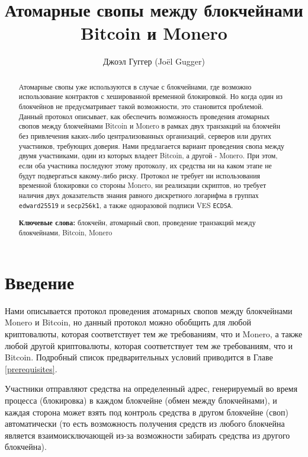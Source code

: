 \documentclass{llncs}
\begin{document}
\title{Атомарные свопы между блокчейнами Bitcoin и Monero}
\author{Джоэл Гуггер (Jo\"el Gugger)}


\maketitle

\begin{abstract}
    Атомарные свопы уже используются в случае с блокчейнами, где возможно использование контрактов с хешированной временной блокировкой. Но когда один из блокчейнов не предусматривает такой возможности, это становится проблемой. Данный протокол описывает, как обеспечить возможность проведения атомарных свопов между блокчейнами Bitcoin и Monero в рамках двух транзакций на блокчейн без привлечения каких-либо централизованных организаций, серверов или других участников, требующих доверия.
    Нами предлагается вариант проведения свопа между двумя участниками, один из которых владеет Bitcoin, а другой - Monero. При этом, если оба участника последуют этому протоколу, их средства ни на каком этапе не будут подвергаться какому-либо риску. Протокол не требует ни использования временной блокировки со стороны Monero, ни реализации скриптов, но требует наличия двух доказательств знания равного дискретного логарифма в группах \texttt{edward25519} и \texttt{secp256k1}, а также одноразовой подписи VES \texttt{ECDSA}.\linebreak
    
    \textbf{Ключевые слова:} блокчейн, атомарный своп, проведение транзакций между блокчейнами, Bitcoin, Monero
\end{abstract}

\section{Введение}
Нами описывается протокол проведения атомарных свопов между блокчейнами Monero и Bitcoin, но данный протокол можно обобщить для любой криптовалюты, которая соответствует тем же требованиям, что и Monero, а также любой другой криптовалюты, которая соответствует тем же требованиям, что и Bitcoin. Подробный список предварительных условий приводится в Главе \ref{prerequisites}.

Участники отправляют средства на определенный адрес, генерируемый во время процесса (блокировка) в каждом блокчейне (обмен между блокчейнами), и каждая сторона может взять под контроль средства в другом блокчейне (своп) автоматически (то есть возможность получения средств из любого блокчейна является взаимоисключающей из-за возможности забирать средства из другого блокчейна).
\end{document}
